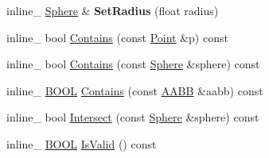 \begin{DoxyCompactItemize}
\item 
\hypertarget{class_sphere_a691141b1317ecdc3887fefb0565d3176}{inline\+\_\+ \hyperlink{class_sphere}{Sphere} \& {\bfseries Set\+Radius} (float radius)}\label{class_sphere_a691141b1317ecdc3887fefb0565d3176}

\item 
inline\+\_\+ bool \hyperlink{class_sphere_a9cfe5aa55b1e19c9ba53d6860dfdc4a3}{Contains} (const \hyperlink{class_point}{Point} \&p) const 
\item 
inline\+\_\+ bool \hyperlink{class_sphere_a319eae210b91c81697ba56ca5a018f45}{Contains} (const \hyperlink{class_sphere}{Sphere} \&sphere) const 
\item 
inline\+\_\+ \hyperlink{_ice_types_8h_a050c65e107f0c828f856a231f4b4e788}{B\+O\+O\+L} \hyperlink{class_sphere_a087d627821bc82578ec5aca1157c700f}{Contains} (const \hyperlink{class_a_a_b_b}{A\+A\+B\+B} \&aabb) const 
\item 
inline\+\_\+ bool \hyperlink{class_sphere_afb707ef9493e1cc9eee4eba1ff47414e}{Intersect} (const \hyperlink{class_sphere}{Sphere} \&sphere) const 
\item 
inline\+\_\+ \hyperlink{_ice_types_8h_a050c65e107f0c828f856a231f4b4e788}{B\+O\+O\+L} \hyperlink{class_sphere_aba1e41199598c0335658031ff1d4bca0}{Is\+Valid} () const 
\end{DoxyCompactItemize}
